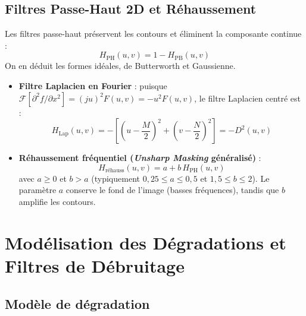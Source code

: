 \subsection{Filtres Passe-Haut 2D et Réhaussement}

Les filtres passe-haut préservent les contours et éliminent la composante continue :
\begin{equation}
    H_{\text{PH}}(u,v) = 1 - H_{\text{PB}}(u,v)
\end{equation}
On en déduit les formes idéales, de Butterworth et Gaussienne.

\begin{proposition}
    \begin{itemize}
        \item \textbf{Filtre Laplacien en Fourier} : puisque $\mathcal{F}[\partial^2 f / \partial x^2] = (ju)^2 F(u,v) = -u^2 F(u,v)$, le filtre Laplacien centré est :
            \begin{equation}
                H_{\text{Lap}}(u,v) = -\left[ \left(u - \frac{M}{2}\right)^2 + \left(v - \frac{N}{2}\right)^2 \right] = -D^2(u,v)
            \end{equation}
        \item \textbf{Réhaussement fréquentiel (\emph{Unsharp Masking} généralisé)} :
            \begin{equation}
                \boxed{H_{\text{réhauss}}(u,v) = a + b \, H_{\text{PH}}(u,v)}
            \end{equation}
            avec $a \geqslant 0$ et $b > a$ (typiquement $0{,}25 \leqslant a \leqslant 0{,}5$ et $1{,}5 \leqslant b \leqslant 2$). Le paramètre $a$ conserve le fond de l'image (basses fréquences), tandis que $b$ amplifie les contours.
    \end{itemize}
\end{proposition}


\section{Modélisation des Dégradations et Filtres de Débruitage}

\subsection{Modèle de dégradation}

